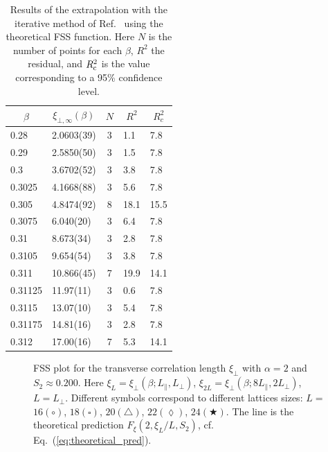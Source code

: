 \documentclass[12pt]{article}
\begin{document}
\begin{table}
\begin{center}
\begin{tabular}{llcll}
\hline
\multicolumn{1}{c}{$\beta$} &
\multicolumn{1}{c}{$\xi_{\bot,\infty}(\beta)$} &
\multicolumn{1}{c}{$N$} &
\multicolumn{1}{c}{$R^2$} &
\multicolumn{1}{c}{$R^2_c$}  \\
\hline
0.28             & 2.0603(39)    & 3 & 1.1 & 7.8 \\
0.29             & 2.5850(50)    & 3 & 1.5 & 7.8 \\
0.3              & 3.6702(52)    & 3 & 3.8 & 7.8 \\
0.3025           & 4.1668(88)    & 3 & 5.6 & 7.8 \\
0.305            & 4.8474(92)    & 8 & 18.1 & 15.5 \\
0.3075           & 6.040(20)     & 3 & 6.4 & 7.8 \\
0.31             & 8.673(34)     & 3 & 2.8 & 7.8 \\
0.3105           & 9.654(54)     & 3 & 3.8 & 7.8 \\
0.311            & 10.866(45)    & 7 & 19.9 & 14.1 \\
0.31125          & 11.97(11)     & 3 & 0.6 & 7.8 \\
0.3115           & 13.07(10)     & 3 & 5.4 & 7.8 \\
0.31175          & 14.81(16)     & 3 & 2.8 & 7.8 \\
0.312            & 17.00(16)     & 7 & 5.3 & 14.1 \\
\hline
\end{tabular} 
\end{center}
\caption{Results of the extrapolation with the iterative method 
of Ref.~\protect\cite{Caracciolo95}
using the theoretical FSS function. Here 
$N$ is the number of points for each $\beta$, $R^2$ the residual, and 
$R^2_{\rm c}$ is the value corresponding to a 95\% confidence level.
}
\label{tab:fss_extrapolation}
\end{table}  




\begin{figure}[h!]
  \centering
\caption{FSS plot for the transverse correlation length $\xi_\bot$ 
  with $\alpha=2$ and $S_2\approx 0.200$. 
  Here $\xi_L = \xi_\bot(\beta;L_\|,L_\bot)$,
       $\xi_{2L} = \xi_\bot(\beta;8L_\|,2L_\bot)$,
       $L=L_\bot$.
  Different symbols correspond to different lattices sizes:
  $L=$ $16(\circ )$, $18(\square )$, $20(\triangle )$, $22(\lozenge )$,
  $24(\bigstar)$. The
  line is the theoretical prediction $F_\xi(2,\xi_L/L,S_2)$, 
  cf. Eq.~(\ref{eq:theoretical_pred}).}
  \label{fig:newfss2xi}
\end{figure}
\end{document}
